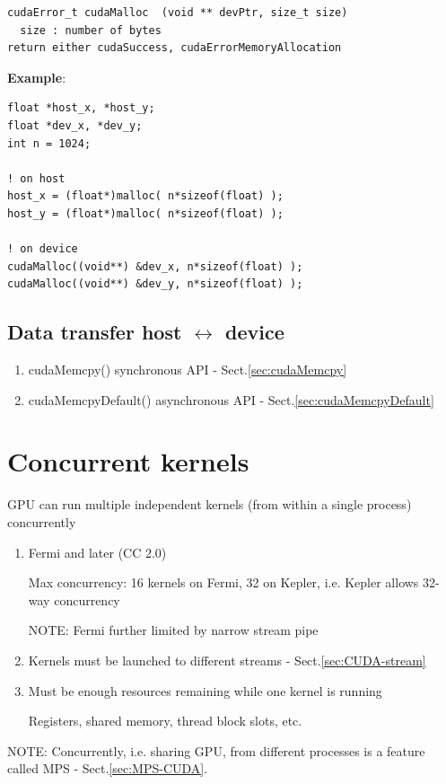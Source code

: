 \begin{lstlisting}
cudaError_t cudaMalloc  (void ** devPtr, size_t size)   
  size : number of bytes
return either cudaSuccess, cudaErrorMemoryAllocation
\end{lstlisting}

{\bf Example}:
\begin{lstlisting}
float *host_x, *host_y;
float *dev_x, *dev_y;
int n = 1024;

! on host
host_x = (float*)malloc( n*sizeof(float) );
host_y = (float*)malloc( n*sizeof(float) );

! on device
cudaMalloc((void**) &dev_x, n*sizeof(float) );
cudaMalloc((void**) &dev_y, n*sizeof(float) );
\end{lstlisting}


\subsection{Data transfer host $\leftrightarrow$ device}
\label{sec:data-transfer-host-1}

\begin{enumerate}
  \item cudaMemcpy()  synchronous API - Sect.\ref{sec:cudaMemcpy}
  
  
  \item cudaMemcpyDefault() asynchronous API - Sect.\ref{sec:cudaMemcpyDefault}
\end{enumerate}


\section{Concurrent kernels}
\label{sec:concurrent-kernel-CUDA-single-process}

GPU can run multiple independent kernels (from within a single process) concurrently 
\begin{enumerate}
  \item  Fermi and later (CC 2.0) 
  
  Max concurrency: 16 kernels on Fermi, 32 on Kepler, i.e.
  Kepler allows 32-way concurrency
  
  NOTE: Fermi further limited by narrow stream pipe
  
  \item Kernels must be launched to different streams - Sect.\ref{sec:CUDA-stream}
  
  \item Must be enough resources remaining while one kernel is running 

Registers, shared memory, thread block slots, etc.
\end{enumerate}
NOTE: Concurrently, i.e. sharing GPU, from different processes is a feature
called MPS - Sect.\ref{sec:MPS-CUDA}.

